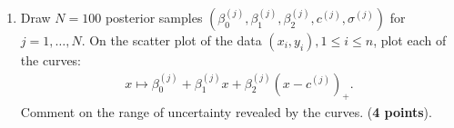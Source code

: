 \documentclass{scrartcl}
\begin{document}
\begin{enumerate}
\begin{enumerate}
    data. Take a grid of values of $c$ in $(2, 60)$, compute the
    unnormalized posterior and then normalize it. Using the discrete
    approximation, compute and report a 95\% uncertainty interval for
    $c$. (\textbf{4 points}).
  \item Draw $N = 100$ posterior samples $(\beta^{(j)}_0, \beta^{(j)}_1,
    \beta^{(j)}_2, c^{(j)}, \sigma^{(j)})$ for $j = 1, \dots, N$. On
    the scatter plot of the data $(x_i, y_i), 1 \leq i \leq n$, plot
    each of the curves:
    \begin{align*}
      x \mapsto \beta^{(j)}_0 + \beta^{(j)}_1 x + \beta^{(j)}_2 (x -
      c^{(j)})_+. 
    \end{align*}
    Comment on the range of uncertainty revealed by the
    curves. (\textbf{4 points}). 
  \end{enumerate}


\end{enumerate}
\end{document}
